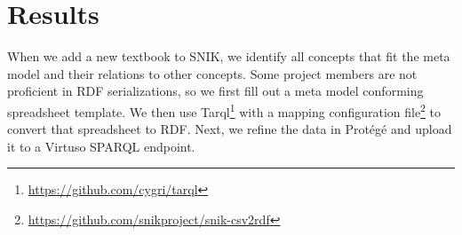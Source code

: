 \documentclass{IOS-Book-Article}     %
\begin{document}
\section{Results}\label{sec:application}

When we add a new textbook to SNIK, we identify all concepts that fit the meta model and their relations to other concepts.
Some project members are not proficient in RDF serializations, so we first fill out a meta model conforming spreadsheet template.
We then use Tarql\footnote{\url{https://github.com/cygri/tarql}} with a mapping configuration file\footnote{\url{https://github.com/snikproject/snik-csv2rdf}} to convert that spreadsheet to RDF.
Next, we refine the data in Protégé and upload it to a Virtuso SPARQL endpoint.
\end{document}

